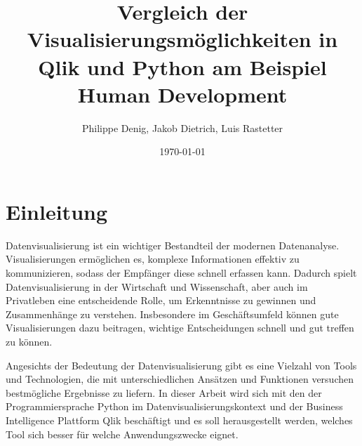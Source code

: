 \documentclass[12pt]{article}
\begin{document}
	
	\title{Vergleich der Visualisierungsmöglichkeiten in Qlik und Python am Beispiel Human Development}
	\author{Philippe Denig, Jakob Dietrich, Luis Rastetter}
	\date{\today}
	
	\maketitle
	
	\newpage
	
	\tableofcontents
	
	\newpage
	
	
	\section{Einleitung} %
	
	
	Datenvisualisierung ist ein wichtiger Bestandteil der modernen Datenanalyse. Visualisierungen ermöglichen es, komplexe Informationen effektiv zu kommunizieren, sodass der Empfänger diese schnell erfassen kann. Dadurch spielt Datenvisualisierung in der Wirtschaft und Wissenschaft, aber auch im Privatleben eine entscheidende Rolle, um Erkenntnisse zu gewinnen und Zusammenhänge zu verstehen. Insbesondere im Geschäftsumfeld können gute Visualisierungen dazu beitragen, wichtige Entscheidungen schnell und gut treffen zu können.
	
	Angesichts der Bedeutung der Datenvisualisierung gibt es eine Vielzahl von Tools und Technologien, die mit unterschiedlichen Ansätzen und Funktionen versuchen bestmögliche Ergebnisse zu liefern. In dieser Arbeit wird sich mit den der Programmiersprache Python im Datenvisualisierungskontext und der Business Intelligence Plattform Qlik beschäftigt und es soll herausgestellt werden, welches Tool sich besser für welche Anwendungszwecke eignet.
	
\end{document}

